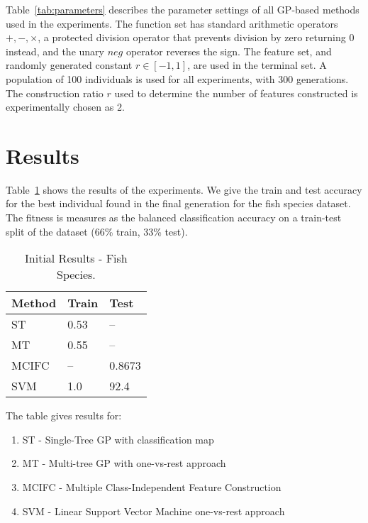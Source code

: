 \documentclass[runningheads]{llncs}
\begin{document}
Table~\ref{tab:parameters} describes the parameter settings of all GP-based methods used in the experiments. 
The function set has standard arithmetic operators ${+,-,\times}$, a protected division operator that prevents division by zero returning 0 instead, and the unary $neg$ operator reverses the sign. 
The feature set, and randomly generated constant $r \in [-1,1]$, are used in the terminal set.
A population of 100 individuals is used for all experiments, with 300 generations.
The construction ratio $r$ used to determine the number of features constructed is experimentally chosen as 2. 

\section{Results}

Table~\ref{tab:results} shows the results of the experiments. 
We give the train and test accuracy for the best individual found in the final generation for the fish species dataset. 
The fitness is measures as the balanced classification accuracy on a train-test split of the dataset (66\% train, 33\% test).

\begin{table}
  \caption{Initial Results - Fish Species.}
  \label{tab:results}
  \centering 
  \begin{tabular}{ l l l  }
    \hline
    Method & Train & Test \\ 
    \hline 
    ST & 0.53 & -- \\ 
    MT & 0.55 & -- \\ 
    MCIFC & -- & 0.8673 \\
    SVM & 1.0 & 92.4 \\ 
    \hline 
  \end{tabular}
\end{table}

The table gives results for: 
\begin{enumerate}
  \item ST - Single-Tree GP with classification map \cite{smart2005genetic}
  \item MT - Multi-tree GP with one-vs-rest approach
  \item MCIFC - Multiple Class-Independent Feature Construction \cite{tran2019genetic}
  \item SVM - Linear Support Vector Machine one-vs-rest approach \cite{long2022ai}
\end{enumerate}
\end{document}
